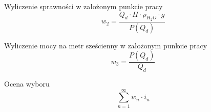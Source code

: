 \begin{flushleft}
    Wyliczenie sprawności w założonym punkcie pracy
    \begin{equation}
        w_2=\frac{Q_d\cdot H\cdot \rho_{H_2O}\cdot g}{P(Q_d)}
    \end{equation}
\end{flushleft} 

\begin{flushleft}
    Wyliczenie mocy na metr sześcienny w założonym punkcie pracy
    \begin{equation}
        w_3=\frac{P(Q_d)}{Q_d}
    \end{equation}
\end{flushleft} 

\begin{flushleft}
    Ocena wyboru
    \begin{equation}
        \sum_{n = 1}^{\infty}  w_n\cdot i_n
    \end{equation}
\end{flushleft} 

    

